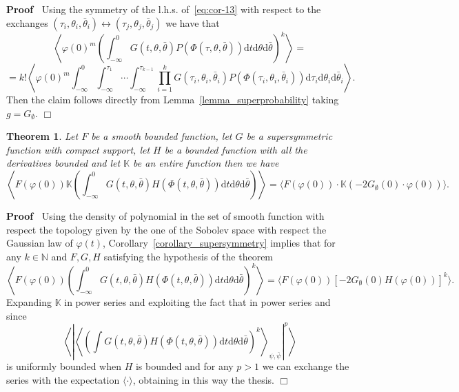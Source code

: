 \documentclass[a4paper,10pt]{article}
\newcommand{\mathd}{\mathrm{d}}
\newenvironment{proof}{\noindent\textbf{Proof\ }}{\hspace*{\fill}$\Box$\medskip}
\newtheorem{theorem}{Theorem}
\begin{document}
\begin{proof}
  Using the symmetry of the l.h.s. of~{\eqref{eq:cor-13}} with respect to the
  exchanges $(\tau_i, \theta_i, \bar{\theta}_i) \longleftrightarrow (\tau_j,
  \theta_j, \bar{\theta}_j)$ we have that
  \[ \left\langle \varphi (0)^m \left( \int_{- \infty}^0 G (t, \theta,
     \bar{\theta}) P (\Phi (\tau, \theta, \bar{\theta})) \mathd t \mathd
     \theta \mathd \bar{\theta} \right)^k \right\rangle = \]
  \[ = k! \left\langle \varphi (0)^m \int_{- \infty}^0 \int_{-
     \infty}^{\tau_1} \cdots \int_{- \infty}^{\tau_{k - 1}} \prod_{i = 1}^k G
     (\tau_i, \theta_i, \bar{\theta}_i) P (\Phi (\tau_i, \theta_i,
     \bar{\theta}_i)) \mathd \tau_i \mathd \theta_i \mathd \bar{\theta}_i
     \right\rangle . \]
  Then the claim follows directly from Lemma~\ref{lemma_superprobability}
  taking $g = G_{\emptyset}$.
\end{proof}

\begin{theorem}
  \label{theorem_localization}Let $F$ be a smooth bounded function, let $G$ be
  a supersymmetric function with compact support, let $H$ be a bounded
  function with all the derivatives bounded and let $\mathbb{K}$ be an entire
  function then we have
  \[ \left\langle F (\varphi (0)) \mathbb{K} \left( \int_{- \infty}^0 G (t,
     \theta, \bar{\theta}) H (\Phi (t, \theta, \bar{\theta})) \mathd t \mathd
     \theta \mathd \bar{\theta} \right) \right\rangle = \langle F (\varphi
     (0)) \cdot \mathbb{K} (- 2 G_{\emptyset} (0) \cdot \varphi (0)) \rangle .
  \]
\end{theorem}

\begin{proof}
  Using the density of polynomial in the set of smooth function with respect
  the topology given by the one of the Sobolev space with respect the Gaussian
  law of $\varphi (t)$, Corollary~\ref{corollary_supersymmetry} implies that
  for any $k \in \mathbb{N}$ and $F, G, H$ satisfying the hypothesis of the
  theorem
  \[ \left\langle F (\varphi (0)) \left( \int_{- \infty}^0 G (t, \theta,
     \bar{\theta}) H (\Phi (t, \theta, \bar{\theta})) \mathd t \mathd \theta
     \mathd \bar{\theta} \right)^k \right\rangle = \langle F (\varphi (0)) [-
     2 G_{\emptyset} (0) H (\varphi (0))]^k \rangle . \]
  Expanding $\mathbb{K}$ in power series and exploiting the fact that in power
  series and since
  \[ \left\langle \left| \left\langle \left( \int G (t, \theta, \bar{\theta})
     H (\Phi (t, \theta, \bar{\theta})) \mathd t \mathd \theta \mathd
     \bar{\theta} \right)^k \right\rangle_{\psi, \bar{\psi}} \right|^p
     \right\rangle \]
  is uniformly bounded when $H$ is bounded and for any $p > 1$ we can exchange
  the series with the expectation $\langle \cdot \rangle$, obtaining in this
  way the thesis.
\end{proof}
\end{document}
